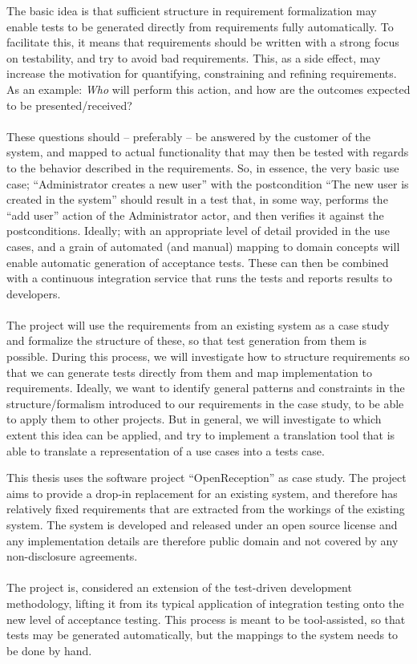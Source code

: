 The basic idea is that sufficient structure in requirement formalization may enable tests to be generated directly from requirements fully automatically. To facilitate this, it means that requirements should be written with a strong focus on testability, and try to avoid bad requirements. This, as a side effect, may increase the motivation for quantifying, constraining and refining requirements. As an example: \emph{Who} will perform this action, and how are the outcomes expected to be presented/received?\\\\
These questions should -- preferably -- be answered by the customer of the system, and mapped to actual functionality that may then be tested with regards to the behavior described in the requirements. So, in essence, the very basic use case; ``Administrator creates a new user'' with the postcondition ``The new user is created in the system'' should result in a test that, in some way, performs the ``add user'' action of the Administrator actor, and then verifies it against the postconditions. Ideally; with an appropriate level of detail provided in the use cases, and a grain of automated (and manual) mapping to domain concepts will enable automatic generation of acceptance tests. These can then be combined with a continuous integration service that runs the tests and reports results to developers.\\\\
The project will use the requirements from an existing system as a case study and formalize the structure of these, so that test generation from them is possible. During this process, we will investigate how to structure requirements so that we can generate tests directly from them and map implementation to requirements. Ideally, we want to identify general patterns and constraints in the structure/formalism introduced to our requirements in the case study, to be able to apply them to other projects. But in general, we will investigate to which extent this idea can be applied, and try to implement a translation tool that is able to translate a representation of a use cases into a tests case.

This thesis uses the software project ``OpenReception'' as case study. The project aims to provide a drop-in replacement for an existing system, and therefore has relatively fixed requirements that are extracted from the workings of the existing system. The system is developed and released under an open source license and any implementation details are therefore public domain and not covered by any non-disclosure agreements. \\\\
The project is, considered an extension of the test-driven development methodology, lifting it from its typical application of integration testing onto the new level of acceptance testing. This process is meant to be tool-assisted, so that tests may be generated automatically, but the mappings to the system needs to be done by hand.